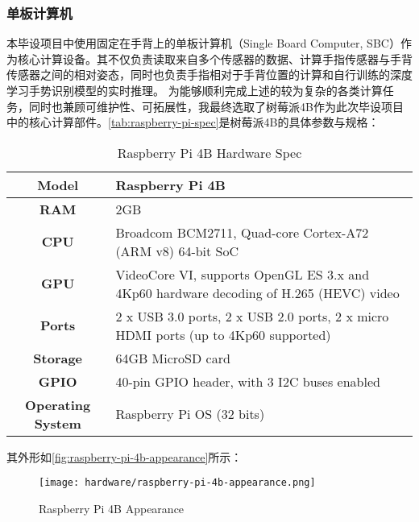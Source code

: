 \subsubsection{单板计算机}
本毕设项目中使用固定在手背上的单板计算机（Single Board Computer, SBC）作为核心计算设备。其不仅负责读取来自多个传感器的数据、计算手指传感器与手背传感器之间的相对姿态，同时也负责手指相对于手背位置的计算和自行训练的深度学习手势识别模型的实时推理。
为能够顺利完成上述的较为复杂的各类计算任务，同时也兼顾可维护性、可拓展性，我最终选取了树莓派4B作为此次毕设项目中的核心计算部件。\autoref{tab:raspberry-pi-spec}是树莓派4B的具体参数与规格：
\begin{table}[ht]
    \caption{\label{tab:raspberry-pi-spec}Raspberry Pi 4B Hardware Spec}
    \begin{tabularx}{\linewidth}{|c|X<{\centering}|}
        \hline
        {\bfseries Model} & Raspberry Pi 4B \\ \hline
        {\bfseries RAM} & 2GB \\ \hline
        {\bfseries CPU} & Broadcom BCM2711, Quad-core Cortex-A72 (ARM v8) 64-bit SoC \\ \hline
        {\bfseries GPU} & VideoCore VI, supports OpenGL ES 3.x and 4Kp60 hardware decoding of H.265 (HEVC) video \\ \hline
        {\bfseries Ports} & 2 x USB 3.0 ports, 2 x USB 2.0 ports, 2 x micro HDMI ports (up to 4Kp60 supported) \\ \hline
        {\bfseries Storage} & 64GB MicroSD card\\ \hline
        {\bfseries GPIO} & 40-pin GPIO header, with 3 I2C buses enabled\\ \hline
        {\bfseries Operating System} & Raspberry Pi OS (32 bits) \\ \hline
    \end{tabularx}
\end{table}

其外形如\autoref{fig:raspberry-pi-4b-appearance}所示：

\begin{figure}[H]
    \centering
    \texttt{[image: hardware/raspberry-pi-4b-appearance.png]}
    \caption{\label{fig:raspberry-pi-4b-appearance}Raspberry Pi 4B Appearance}
\end{figure}

